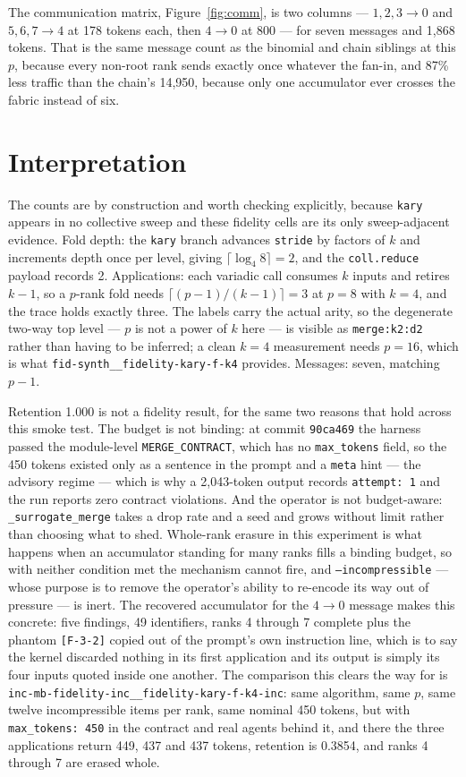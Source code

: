 \documentclass[11pt]{article}
\begin{document}
The communication matrix, Figure~\ref{fig:comm}, is two columns --- $1,2,3\!\to\!0$ and
$5,6,7\!\to\!4$ at 178 tokens each, then $4\!\to\!0$ at 800 --- for seven messages and
1{,}868 tokens. That is the same message count as the binomial and chain siblings at this
$p$, because every non-root rank sends exactly once whatever the fan-in, and 87\% less
traffic than the chain's 14{,}950, because only one accumulator ever crosses the fabric
instead of six.

\section{Interpretation}

The counts are by construction and worth checking explicitly, because \texttt{kary} appears
in no collective sweep and these fidelity cells are its only sweep-adjacent evidence. Fold
depth: the \texttt{kary} branch advances \texttt{stride} by factors of $k$ and increments
depth once per level, giving $\lceil\log_4 8\rceil = 2$, and the \texttt{coll.reduce} payload
records 2. Applications: each variadic call consumes $k$ inputs and retires $k-1$, so a
$p$-rank fold needs $\lceil (p-1)/(k-1)\rceil = 3$ at $p=8$ with $k=4$, and the trace holds
exactly three. The labels carry the actual arity, so the degenerate two-way top level ---
$p$ is not a power of $k$ here --- is visible as \texttt{merge:k2:d2} rather than having to
be inferred; a clean $k=4$ measurement needs $p=16$, which is what
\texttt{fid-synth\_\_fidelity-kary-f-k4} provides. Messages: seven, matching $p-1$.

Retention 1.000 is not a fidelity result, for the same two reasons that hold across this
smoke test. The budget is not binding: at commit \texttt{90ca469} the harness passed the
module-level \texttt{MERGE\_CONTRACT}, which has no \texttt{max\_tokens} field, so the 450
tokens existed only as a sentence in the prompt and a \texttt{meta} hint --- the advisory
regime --- which is why a 2{,}043-token output records \texttt{attempt: 1} and the run
reports zero contract violations. And the operator is not budget-aware:
\texttt{\_surrogate\_merge} takes a drop rate and a seed and grows without limit rather than
choosing what to shed. Whole-rank erasure in this experiment is what happens when an
accumulator standing for many ranks fills a binding budget, so with neither condition met the
mechanism cannot fire, and \texttt{--incompressible} --- whose purpose is to remove the
operator's ability to re-encode its way out of pressure --- is inert. The recovered
accumulator for the $4\to0$ message makes this concrete: five findings, 49 identifiers, ranks
4 through 7 complete plus the phantom \texttt{[F-3-2]} copied out of the prompt's own
instruction line, which is to say the kernel discarded nothing in its first application and
its output is simply its four inputs quoted inside one another. The comparison this clears
the way for is \texttt{inc-mb-fidelity-inc\_\_fidelity-kary-f-k4-inc}: same algorithm, same
$p$, same twelve incompressible items per rank, same nominal 450 tokens, but with
\texttt{max\_tokens: 450} in the contract and real agents behind it, and there the three
applications return 449, 437 and 437 tokens, retention is 0.3854, and ranks 4 through 7 are
erased whole.
\end{document}

